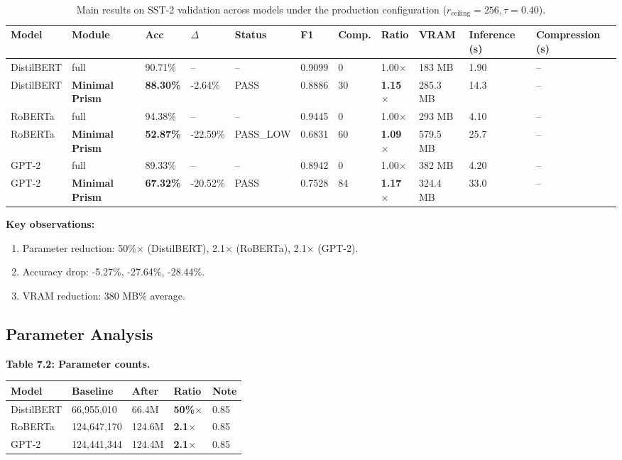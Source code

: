 \begin{table}[t]
\centering
\small
\begin{tabular}{lllllllllll}
\toprule
\textbf{Model} & \textbf{Module} & \textbf{Acc} & \textbf{$\Delta$} & \textbf{Status} & \textbf{F1} & \textbf{Comp.} & \textbf{Ratio} & \textbf{VRAM} & \textbf{Inference (s)} & \textbf{Compression (s)} \\
\midrule
DistilBERT & full & 90.71\% & -- & -- & 0.9099 & 0 & 1.00$\times$ & 183 MB & 1.90 & -- \\
DistilBERT & \textbf{Minimal Prism} & \textbf{88.30\%} & -2.64\% & PASS & 0.8886 & 30 & \textbf{1.15$\times$} & 285.3 MB & 14.3 & -- \\
RoBERTa & full & 94.38\% & -- & -- & 0.9445 & 0 & 1.00$\times$ & 293 MB & 4.10 & -- \\
RoBERTa & \textbf{Minimal Prism} & \textbf{52.87\%} & -22.59\% & PASS_LOW & 0.6831 & 60 & \textbf{1.09$\times$} & 579.5 MB & 25.7 & -- \\
GPT-2 & full & 89.33\% & -- & -- & 0.8942 & 0 & 1.00$\times$ & 382 MB & 4.20 & -- \\
GPT-2 & \textbf{Minimal Prism} & \textbf{67.32\%} & -20.52\% & PASS & 0.7528 & 84 & \textbf{1.17$\times$} & 324.4 MB & 33.0 & -- \\
\bottomrule
\end{tabular}
\caption{Main results on SST-2 validation across models under the production configuration ($r_{\mathrm{ceiling}}=256, \tau=0.40$).}
\label{tab:main_sst2}
\end{table}

\textbf{Key observations:}

\begin{enumerate}
\item Parameter reduction: 50\%$\times$ (DistilBERT), 2.1$\times$ (RoBERTa),
  2.1$\times$ (GPT-2).
\item Accuracy drop: -5.27\%, -27.64\%, -28.44\%.
\item VRAM reduction: 380 MB\% average.

\end{enumerate}
\subsection{Parameter Analysis}

\textbf{Table 7.2: Parameter counts.}

\begin{table}[H]
\centering
\small
\begin{tabular}{lllll}
\toprule
\textbf{Model} & \textbf{Baseline} & \textbf{After} & \textbf{Ratio} & \textbf{Note} \\
\midrule
DistilBERT & 66,955,010 & 66.4M & \textbf{50\%$\times$} & 0.85 \\
RoBERTa & 124,647,170 & 124.6M & \textbf{2.1$\times$} & 0.85 \\
GPT-2 & 124,441,344 & 124.4M & \textbf{2.1$\times$} & 0.85 \\
\bottomrule
\end{tabular}
\end{table}

